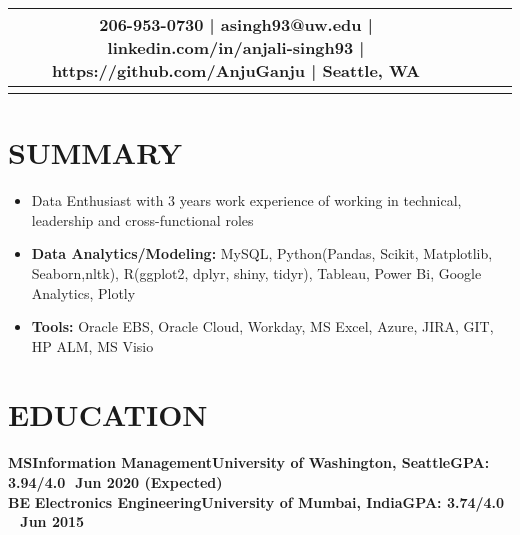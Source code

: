 \documentclass[11.5pt,a4paper,roman]{moderncv}        %
\begin{document}
\makecvtitle
\vspace*{-19mm}

\begin{center}
\begin{tabular}{ c c c c }
   206-953-0730  | asingh93@uw.edu | linkedin.com/in/anjali-singh93 | https://github.com/AnjuGanju | Seattle, WA \\  
\hline
\vspace*{-7mm}
\end{tabular}
\end{center}


\section{\large SUMMARY}

\vspace{-1mm} 
\begin{itemize}
\renewcommand{\labelitemi}{$\bullet$}
\item Data Enthusiast with 3 years work experience of working in technical, leadership and cross-functional roles
 \item \textbf{Data Analytics/Modeling:} MySQL, Python(Pandas, Scikit, Matplotlib, Seaborn,nltk), R(ggplot2, dplyr, shiny, tidyr), Tableau, Power Bi, Google Analytics, Plotly  
 \item \textbf{Tools:} Oracle EBS, Oracle Cloud, Workday,  MS Excel, Azure, JIRA, GIT, HP ALM, MS Visio
 \end{itemize}
 \vspace{-3mm} 

\section{\large EDUCATION}


\textbf{MS\quad\quad Information Management\quad\quad University of Washington, Seattle\quad\quad GPA: 3.94/4.0\quad\,\, Jun 2020 (Expected)\\}
\textbf{BE\quad\quad\,\,Electronics Engineering\quad\quad\quad University of Mumbai, India\quad\quad\quad\quad GPA: 3.74/4.0 \quad\quad\quad\quad\quad\,\,\, Jun 2015\\}
 \vspace{-8mm} 
\end{document}
